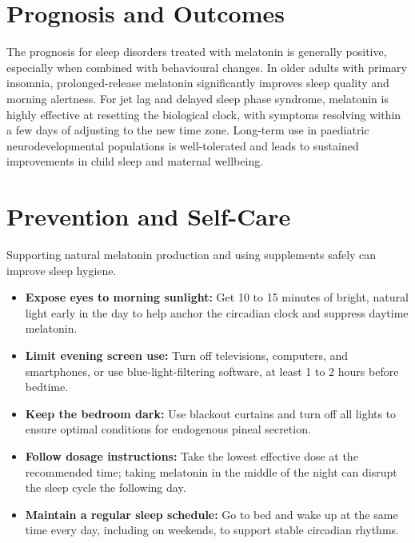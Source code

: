 \section*{Prognosis and Outcomes}
The prognosis for sleep disorders treated with melatonin is generally positive, especially when combined with behavioural changes. In older adults with primary insomnia, prolonged-release melatonin significantly improves sleep quality and morning alertness. For jet lag and delayed sleep phase syndrome, melatonin is highly effective at resetting the biological clock, with symptoms resolving within a few days of adjusting to the new time zone. Long-term use in paediatric neurodevelopmental populations is well-tolerated and leads to sustained improvements in child sleep and maternal wellbeing.

\section*{Prevention and Self-Care}
Supporting natural melatonin production and using supplements safely can improve sleep hygiene.
\begin{itemize}
    \item \textbf{Expose eyes to morning sunlight:} Get 10 to 15 minutes of bright, natural light early in the day to help anchor the circadian clock and suppress daytime melatonin.
    \item \textbf{Limit evening screen use:} Turn off televisions, computers, and smartphones, or use blue-light-filtering software, at least 1 to 2 hours before bedtime.
    \item \textbf{Keep the bedroom dark:} Use blackout curtains and turn off all lights to ensure optimal conditions for endogenous pineal secretion.
    \item \textbf{Follow dosage instructions:} Take the lowest effective dose at the recommended time; taking melatonin in the middle of the night can disrupt the sleep cycle the following day.
    \item \textbf{Maintain a regular sleep schedule:} Go to bed and wake up at the same time every day, including on weekends, to support stable circadian rhythms.
\end{itemize}

